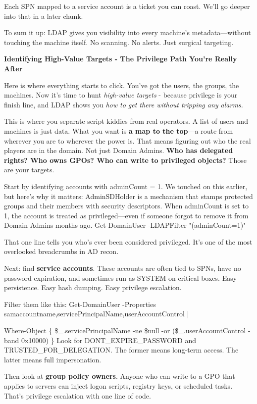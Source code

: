 Each SPN mapped to a service account is a ticket you can roast. We'll go deeper into that in a later chunk.

To sum it up: LDAP gives you visibility into every machine’s metadata—without touching the machine itself. No scanning. No alerts. Just surgical targeting.

\textbf{Identifying High-Value Targets - The Privilege Path You’re Really After}

Here is where everything starts to click. You’ve got the users, the groups, the machines. Now it’s time to hunt \textit{high-value targets} - because privilege is your finish line, and LDAP shows you \textit{how to get there without tripping any alarms.}

This is where you separate script kiddies from real operators. A list of users and machines is just data. What you want is \textbf{a map to the top}—a route from wherever you are to wherever the power is. That means figuring out who the real players are in the domain. Not just Domain Admins. \textbf{Who has delegated rights? Who owns GPOs? Who can write to privileged objects?} Those are your targets.

Start by identifying accounts with adminCount = 1. We touched on this earlier, but here’s why it matters: AdminSDHolder is a mechanism that stamps protected groups and their members with security descriptors. When adminCount is set to 1, the account is treated as privileged—even if someone forgot to remove it from Domain Admins months ago.
Get-DomainUser -LDAPFilter "(adminCount=1)"

That one line tells you who’s ever been considered privileged. It’s one of the most overlooked breadcrumbs in AD recon.

Next: find \textbf{service accounts}. These accounts are often tied to SPNs, have no password expiration, and sometimes run as SYSTEM on critical boxes. Easy persistence. Easy hash dumping. Easy privilege escalation.

Filter them like this:
Get-DomainUser -Properties samaccountname,servicePrincipalName,userAccountControl |

Where-Object \{ \$\_.servicePrincipalName -ne \$null -or (\$\_.userAccountControl -band 0x10000) \}
Look for DONT\_EXPIRE\_PASSWORD and TRUSTED\_FOR\_DELEGATION. The former means long-term access. The latter means full impersonation.

Then look at \textbf{group policy owners}. Anyone who can write to a GPO that applies to servers can inject logon scripts, registry keys, or scheduled tasks. That’s privilege escalation with one line of code.

